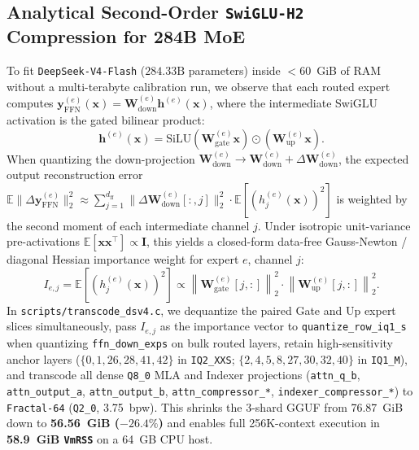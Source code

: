 \documentclass[10pt,twocolumn]{article}
\begin{document}
\subsection{Analytical Second-Order \texttt{SwiGLU-H2} Compression for 284B MoE}
To fit \texttt{DeepSeek-V4-Flash} ($284.33\text{B}$ parameters) inside $<60$~GiB of RAM without a multi-terabyte calibration run, we observe that each routed expert computes $\mathbf{y}_{\text{FFN}}^{(e)}(\mathbf{x}) = \mathbf{W}_{\text{down}}^{(e)} \mathbf{h}^{(e)}(\mathbf{x})$, where the intermediate SwiGLU activation is the gated bilinear product:
\begin{equation}
    \mathbf{h}^{(e)}(\mathbf{x}) = \text{SiLU}\!\left(\mathbf{W}_{\text{gate}}^{(e)} \mathbf{x}\right) \odot \left(\mathbf{W}_{\text{up}}^{(e)} \mathbf{x}\right).
\end{equation}
When quantizing the down-projection $\mathbf{W}_{\text{down}}^{(e)} \to \mathbf{W}_{\text{down}}^{(e)} + \Delta\mathbf{W}_{\text{down}}^{(e)}$, the expected output reconstruction error $\mathbb{E}\|\Delta\mathbf{y}_{\text{FFN}}^{(e)}\|_2^2 \approx \sum_{j=1}^{d_{\text{ff}}} \|\Delta\mathbf{W}_{\text{down}}^{(e)}[:,j]\|_2^2 \cdot \mathbb{E}[(h_j^{(e)}(\mathbf{x}))^2]$ is weighted by the second moment of each intermediate channel $j$. Under isotropic unit-variance pre-activations $\mathbb{E}[\mathbf{x}\mathbf{x}^\top] \propto \mathbf{I}$, this yields a closed-form data-free Gauss-Newton / diagonal Hessian importance weight for expert $e$, channel $j$:
\begin{equation}
    I_{e,j} = \mathbb{E}\!\left[(h_j^{(e)}(\mathbf{x}))^2\right] \propto \left\|\mathbf{W}_{\text{gate}}^{(e)}[j,:]\right\|_2^2 \cdot \left\|\mathbf{W}_{\text{up}}^{(e)}[j,:]\right\|_2^2.
\end{equation}
In \texttt{scripts/transcode\_dsv4.c}, we dequantize the paired Gate and Up expert slices simultaneously, pass $I_{e,j}$ as the importance vector to \texttt{quantize\_row\_iq1\_s} when quantizing \texttt{ffn\_down\_exps} on bulk routed layers, retain high-sensitivity anchor layers ($\{0, 1, 26, 28, 41, 42\}$ in \texttt{IQ2\_XXS}; $\{2, 4, 5, 8, 27, 30, 32, 40\}$ in \texttt{IQ1\_M}), and transcode all dense \texttt{Q8\_0} MLA and Indexer projections (\texttt{attn\_q\_b}, \texttt{attn\_output\_a}, \texttt{attn\_output\_b}, \texttt{attn\_compressor\_*}, \texttt{indexer\_compressor\_*}) to \texttt{Fractal-64} (\texttt{Q2\_0}, 3.75~bpw). This shrinks the 3-shard GGUF from 76.87~GiB down to \textbf{56.56~GiB ($-26.4\%$)} and enables full 256K-context execution in \textbf{58.9~GiB \texttt{VmRSS}} on a 64~GB CPU host.
\end{document}
